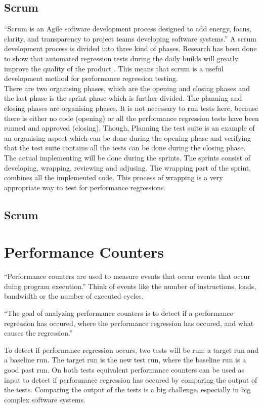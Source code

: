 \subsection{Scrum} 
``Scrum is an Agile software development process designed to add energy, focus, clarity, and transparency to project teams developing software systems.''\cite{sutherland2007distributed} A scrum development process is divided into three kind of phases. Research has been done to show that automated regression tests during the daily builds will greatly improve the quality of the product \cite{Future_of_Scrum}. This means that scrum is a useful development method for performance regression testing. \\ There are two organising phases, which are the opening and closing phases and the last phase is the sprint phase which is further divided. The planning and closing phases are organising phases. It is not necessary to run tests here, because there is either no code (opening) or all the performance regression tests have been runned and approved (closing). Though, Planning the test suite is an example of an organising aspect which can be done during the opening phase and verifying that the test suite contains all the tests can be done during the closing phase. \\ The actual implementing will be done during the sprints. The sprints consist of developing, wrapping, reviewing and adjusing. The wrapping part of the sprint, combines all the implemented code. This process of wrapping is a very appropriate way to test for performance regressions.
\subsection{Scrum}

\section{Performance Counters}``Performance counters are used to measure events that occur events that occur duing program execution.''\cite{PC} Think of events like the number of instructions, loads, bandwidth or the number of executed cycles.

``The goal of analyzing performance counters is to detect if a performance regression has occured, where the performance regression has occured, and what causes the regression.'' \cite{nguyen2012using}

To detect if performance regression occurs, two tests will be run: a target run and a baseline run. The target run is the new test run, where the baseline run is a good past run. On both tests equivalent performance counters can be used as input to detect if performance regression has occured by comparing the output of the tests. Comparing the output of the tests is a big challenge, especially in big complex software systems.

